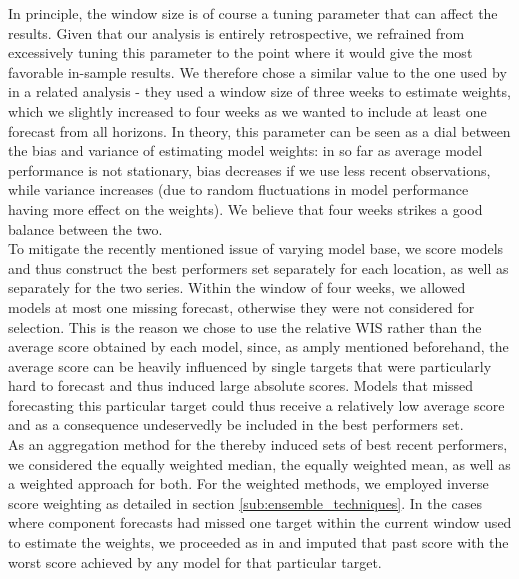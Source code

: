 In principle, the window size is of course a tuning parameter that can affect the results. Given that our analysis is entirely retrospective, we refrained from excessively tuning this parameter to the point where it would give the most favorable in-sample results. We therefore chose a similar value to the one used by \cite{bracher_evaluating_2021} in a related analysis - they used a window size of three weeks to estimate weights, which we slightly increased to four weeks as we wanted to include at least one forecast from all horizons. In theory, this parameter can be seen as a dial between the bias and variance of estimating model weights: in so far as average model performance is not stationary, bias decreases if we use less recent observations, while variance increases (due to random fluctuations in model performance having more effect on the weights). We believe that four weeks strikes a good balance between the two. \\%
To mitigate the recently mentioned issue of varying model base, we score models and thus construct the best performers set separately for each location, as well as separately for the two series. Within the window of four weeks, we allowed models at most one missing forecast, otherwise they were not considered for selection. This is the reason we chose to use the relative WIS rather than the average score obtained by each model, since, as amply mentioned beforehand, the average score can be heavily influenced by single targets that were particularly hard to forecast and thus induced large absolute scores. Models that missed forecasting this particular target could thus receive a relatively low average score and as a consequence undeservedly be included in the best performers set.\\
As an aggregation method for the thereby induced sets of best recent performers, we considered the equally weighted median, the equally weighted mean, as well as a weighted approach for both. For the weighted methods, we employed inverse score weighting as detailed in section \ref{sub:ensemble_techniques}. In the cases where component forecasts had missed one target within the current window used to estimate the weights, we proceeded as in \cite{bracher_evaluating_2021} and imputed that past score with the worst score achieved by any model for that particular target.\\
